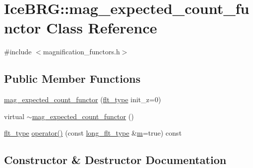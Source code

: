 \hypertarget{classIceBRG_1_1mag__expected__count__functor}{}\section{Ice\+B\+R\+G\+:\+:mag\+\_\+expected\+\_\+count\+\_\+functor Class Reference}
\label{classIceBRG_1_1mag__expected__count__functor}


{\ttfamily \#include $<$magnification\+\_\+functors.\+h$>$}

\subsection*{Public Member Functions}
\begin{DoxyCompactItemize}
\item 
\hyperlink{classIceBRG_1_1mag__expected__count__functor_ae8cfd011211991dd4d66d3aa26b228e2}{mag\+\_\+expected\+\_\+count\+\_\+functor} (\hyperlink{lib_2IceBRG__main_2common_8h_ad0f130a56eeb944d9ef2692ee881ecc4}{flt\+\_\+type} init\+\_\+z=0)
\item 
virtual \hyperlink{classIceBRG_1_1mag__expected__count__functor_ad371e59c7eccf99936b1464eab520234}{$\sim$mag\+\_\+expected\+\_\+count\+\_\+functor} ()
\item 
\hyperlink{lib_2IceBRG__main_2common_8h_ad0f130a56eeb944d9ef2692ee881ecc4}{flt\+\_\+type} \hyperlink{classIceBRG_1_1mag__expected__count__functor_a1634698c687459cc3476fac2f548384d}{operator()} (const \hyperlink{lib_2IceBRG__main_2common_8h_a7040956e7e1b504d34a9ccfb4253bdce}{long\+\_\+flt\+\_\+type} \&\hyperlink{namespaceIceBRG_ada6365c5d16106f0608afbd34f010bcc}{m}=true) const 
\end{DoxyCompactItemize}


\subsection{Constructor \& Destructor Documentation}
\hypertarget{classIceBRG_1_1mag__expected__count__functor_ae8cfd011211991dd4d66d3aa26b228e2}{}
